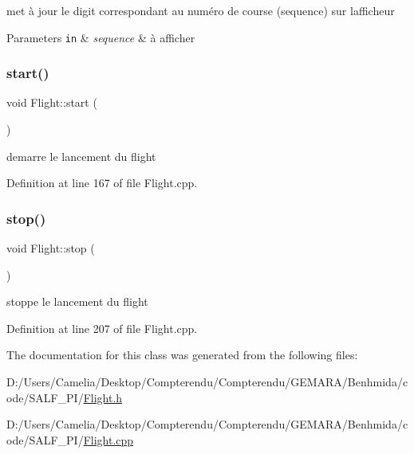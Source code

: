 met à jour le digit correspondant au numéro de course (sequence) sur l\textquotesingle{}afficheur 


\begin{DoxyParams}[1]{Parameters}
\mbox{\tt in}  & {\em sequence} & à afficher \\
\hline
\end{DoxyParams}
\mbox{\label{class_flight_ac5b91d4615b20ee19f9f113cb061313c}} 
\subsubsection{\texorpdfstring{start()}{start()}}
{\footnotesize\ttfamily void Flight\+::start (\begin{DoxyParamCaption}{ }\end{DoxyParamCaption})}



demarre le lancement du flight 



Definition at line 167 of file Flight.\+cpp.

\mbox{\label{class_flight_a42aa7eb78de33bc6cae6e0a0a569e9eb}} 
\subsubsection{\texorpdfstring{stop()}{stop()}}
{\footnotesize\ttfamily void Flight\+::stop (\begin{DoxyParamCaption}{ }\end{DoxyParamCaption})}



stoppe le lancement du flight 



Definition at line 207 of file Flight.\+cpp.



The documentation for this class was generated from the following files\+:\begin{DoxyCompactItemize}
\item 
D\+:/\+Users/\+Camelia/\+Desktop/\+Compterendu/\+Compterendu/\+G\+E\+M\+A\+R\+A/\+Benhmida/code/\+S\+A\+L\+F\+\_\+\+P\+I/\hyperlink{_flight_8h}{Flight.\+h}\item 
D\+:/\+Users/\+Camelia/\+Desktop/\+Compterendu/\+Compterendu/\+G\+E\+M\+A\+R\+A/\+Benhmida/code/\+S\+A\+L\+F\+\_\+\+P\+I/\hyperlink{_flight_8cpp}{Flight.\+cpp}\end{DoxyCompactItemize}
